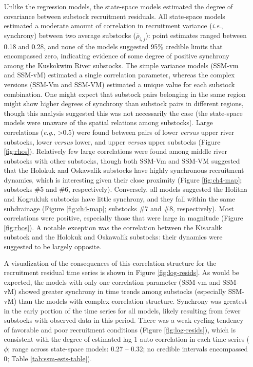 \documentclass[12pt,]{book}
\theoremstyle{definition}
\theoremstyle{definition}
\theoremstyle{definition}
\theoremstyle{remark}
\begin{document}
Unlike the regression models, the state-space models estimated the
degree of covariance between substock recruitment residuals. All
state-space models estimated a moderate amount of correlation in
recruitment variance (\emph{i}.\emph{e}., synchrony) between two average
substocks (\(\bar{\rho}_{i,j}\)): point estimates ranged between 0.18
and 0.28, and none of the models suggested 95\% credible limits that
encompassed zero, indicating evidence of some degree of positive
synchrony among the Kuskokwim River substocks. The simple variance
models (SSM-vm and SSM-vM) estimated a single correlation parameter,
whereas the complex versions (SSM-Vm and SSM-VM) estimated a unique
value for each substock combination. One might expect that substock
pairs belonging in the same region might show higher degrees of
synchrony than substock pairs in different regions, though this analysis
suggested this was not necessarily the case (the state-space models were
unaware of the spatial relations among substocks). Large correlations
(\emph{e}.\emph{g}., \textgreater{}0.5) were found between pairs of
lower \emph{versus} upper river substocks, lower \emph{versus} lower,
and upper \emph{versus} upper substocks (Figure \ref{fig:rhos}).
Relatively few large correlations were found among middle river
substocks with other substocks, though both SSM-Vm and SSM-VM suggested
that the Holokuk and Oskawalik substocks have highly synchronous
recruitment dynamics, which is interesting given their close proximity
(Figure \ref{fig:ch4-map}; substocks \#5 and \#6, respectively).
Conversely, all models suggested the Holitna and Kogrukluk substocks
have little synchrony, and they fall within the same subdrainage (Figure
\ref{fig:ch4-map}; substocks \#7 and \#8, respectively). Most
correlations were positive, especially those that were large in
magnitude (Figure \ref{fig:rhos}). A notable exception was the
correlation between the Kisaralik substock and the Holokuk and Oskawalik
substocks: their dynamics were suggested to be largely opposite.

A visualization of the consequences of this correlation structure for
the recruitment residual time series is shown in Figure
\ref{fig:log-resids}. As would be expected, the models with only one
correlation parameter (SSM-vm and SSM-vM) showed greater synchrony in
time trends among substocks (especially SSM-vM) than the models with
complex correlation structure. Synchrony was greatest in the early
portion of the time series for all models, likely resulting from fewer
substocks with observed data in this period. There was a weak cycling
tendency of favorable and poor recruitment conditions (Figure
\ref{fig:log-resids}), which is consistent with the degree of estimated
lag-1 auto-correlation in each time series (\(\phi\); range across
state-space models: 0.27 -- 0.32; no credible intervals encompassed 0;
Table \ref{tab:ssm-ests-table}).
\end{document}
